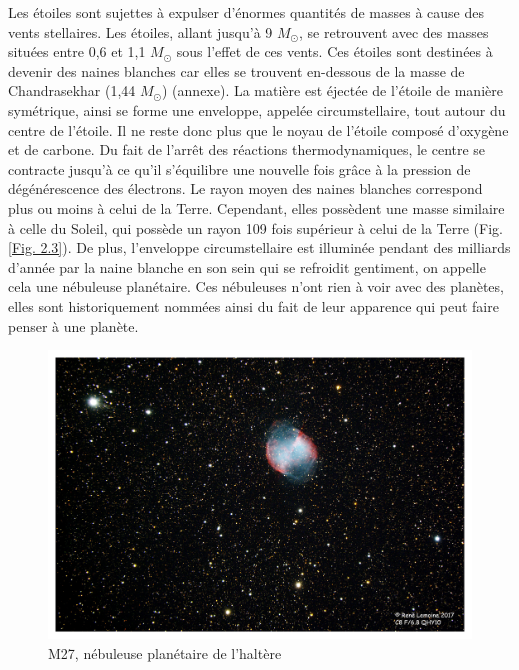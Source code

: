 Les étoiles sont sujettes à expulser d’énormes quantités de masses à cause des vents stellaires. Les étoiles, allant jusqu’à 9 $M_\odot$, se retrouvent avec des masses situées entre 0,6 et 1,1 $M_\odot$ sous l’effet de ces vents. Ces étoiles sont destinées à devenir des naines blanches car elles se trouvent en-dessous de la masse de Chandrasekhar (1,44 $M_\odot$) (annexe). La matière est éjectée de l’étoile de manière symétrique, ainsi se forme une enveloppe, appelée circumstellaire, tout autour du centre de l’étoile. Il ne reste donc plus que le noyau de l’étoile composé d’oxygène et de carbone. Du fait de l’arrêt des réactions thermodynamiques, le centre se contracte jusqu’à ce qu’il s’équilibre une nouvelle fois grâce à la pression de dégénérescence des électrons. Le rayon moyen des naines blanches correspond plus ou moins à celui de la Terre. Cependant, elles possèdent une masse similaire à celle du Soleil, qui possède un rayon 109 fois supérieur à celui de la Terre (Fig. \ref{Fig. 2.3}). De plus, l’enveloppe circumstellaire est illuminée pendant des milliards d’année par la naine blanche en son sein qui se refroidit gentiment, on appelle cela une nébuleuse planétaire. Ces nébuleuses n’ont rien à voir avec des planètes, elles sont historiquement nommées ainsi du fait de leur apparence qui peut faire penser à une planète.\newpage 

\begin{figure}[H]\vspace{1cm}
	\centering
	\includegraphics[scale=0.4]{images/m27}
	\caption[M27, nébuleuse planétaire de l'haltère - astrophoto prise par René Lemoine le 30 juillet 2017 avec un Celestron 8 (1h50 de pose)]{M27, nébuleuse planétaire de l'haltère}
	\label{Fig. 2.5}
\end{figure}  

